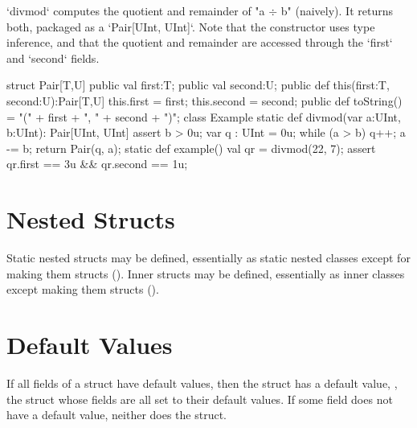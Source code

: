 \xcd`divmod` computes the quotient and remainder of \xcdmath"a $\div$ b" (naively).
It returns both, packaged as a \xcd`Pair[UInt, UInt]`.  Note that the
constructor uses type inference, and that the quotient and remainder are
accessed through the \xcd`first` and \xcd`second` fields.
\begin{xten}
struct Pair[T,U] {
    public val first:T;
    public val second:U;
    public def this(first:T, second:U):Pair[T,U] {
        this.first = first;
        this.second = second;
    }
    public def toString() 
        = "(" + first + ", " + second + ")";
}
class Example {
  static def divmod(var a:UInt, b:UInt): Pair[UInt, UInt] {
     assert b > 0u;
     var q : UInt = 0u;
     while (a > b) {q++; a -= b;}
     return Pair(q, a); 
  }
  static def example() {
     val qr = divmod(22, 7);
     assert qr.first == 3u && qr.second == 1u;
  }
}
\end{xten}

\section{Nested Structs}

Static nested structs may be defined, essentially as static nested classes
except for making them structs
().  Inner structs may be defined, essentially as
inner classes except making them structs ().

\section{Default Values}

If all fields of a struct have default values, then the struct has a
default value, \viz, the struct whose fields are all set to their
default values.  If some field does not have a default value, neither
does the struct.

